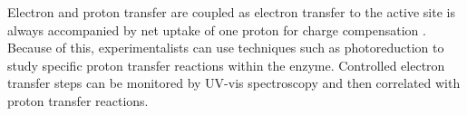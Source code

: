 
Electron and proton transfer are coupled as electron transfer to the active site is always accompanied by net uptake of one proton for charge compensation \cite{Gennis:2004p10239}. Because of this, experimentalists can use techniques such as photoreduction to study specific proton transfer reactions within the enzyme. Controlled electron transfer steps can be monitored by UV-vis spectroscopy and then correlated with proton transfer reactions.






%
%





